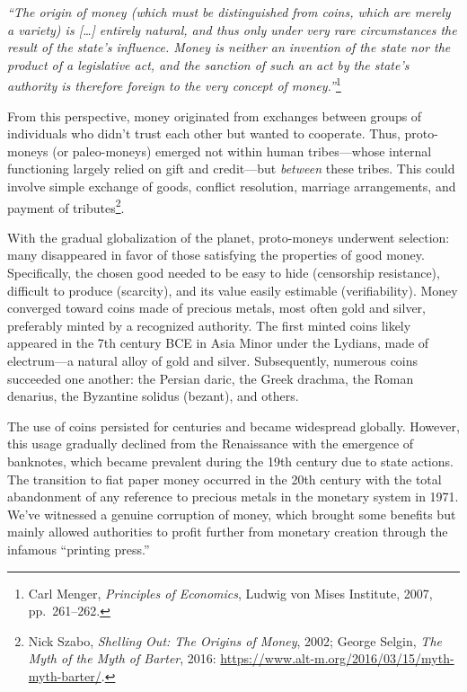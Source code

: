 \documentclass[
  a5paper,
  smalldemyvopaper,10pt,twoside,onecolumn,openright,extrafontsizes,hidelinks]{memoir}
\begin{document}
\emph{``The origin of money (which must be distinguished from coins,
which are merely a variety) is {[}\ldots{]} entirely natural, and thus
only under very rare circumstances the result of the state's influence.
Money is neither an invention of the state nor the product of a
legislative act, and the sanction of such an act by the state's
authority is therefore foreign to the very concept of
money.''}\footnote{Carl Menger, \emph{Principles of Economics}, Ludwig
  von Mises Institute, 2007, pp.~261--262.}

From this perspective, money originated from exchanges between groups of
individuals who didn't trust each other but wanted to cooperate. Thus,
proto-moneys (or paleo-moneys) emerged not within human tribes---whose
internal functioning largely relied on gift and credit---but
\emph{between} these tribes. This could involve simple exchange of
goods, conflict resolution, marriage arrangements, and payment of
tributes\footnote{Nick Szabo, \emph{Shelling Out: The Origins of Money},
  2002; George Selgin, \emph{The Myth of the Myth of Barter}, 2016:
  \url{https://www.alt-m.org/2016/03/15/myth-myth-barter/}.}.

With the gradual globalization of the planet, proto-moneys underwent
selection: many disappeared in favor of those satisfying the properties
of good money. Specifically, the chosen good needed to be easy to hide
(censorship resistance), difficult to produce (scarcity), and its value
easily estimable (verifiability). Money converged toward coins made of
precious metals, most often gold and silver, preferably minted by a
recognized authority. The first minted coins likely appeared in the 7th
century BCE in Asia Minor under the Lydians, made of electrum---a
natural alloy of gold and silver. Subsequently, numerous coins succeeded
one another: the Persian daric, the Greek drachma, the Roman denarius,
the Byzantine solidus (bezant), and others.

The use of coins persisted for centuries and became widespread globally.
However, this usage gradually declined from the Renaissance with the
emergence of banknotes, which became prevalent during the 19th century
due to state actions. The transition to fiat paper money occurred in the
20th century with the total abandonment of any reference to precious
metals in the monetary system in 1971. We've witnessed a genuine
corruption of money, which brought some benefits but mainly allowed
authorities to profit further from monetary creation through the
infamous ``printing press.''
\end{document}
